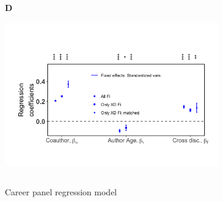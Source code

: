 \documentclass[10pt]{article}          %
\begin{document}
\begin{figure}[!htb]
  \endminipage\hfill
    \textbf{D}\\
    \includegraphics[width=9.3cm, height=7cm]{5B.png}
  \endminipage
  \caption{Career panel regression model}
  \label{fig:5}
\end{figure}
\end{document}
